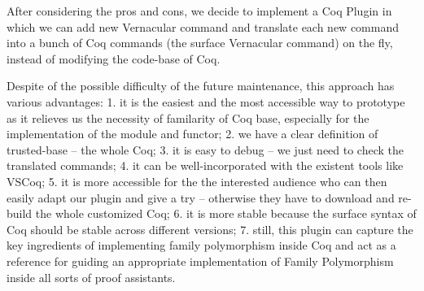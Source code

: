 After considering the pros and cons, we decide to implement a Coq Plugin in which we can add new Vernacular command and translate each new command into a bunch of Coq commands (the surface Vernacular command) on the fly, instead of modifying the code-base of Coq. 

Despite of the possible difficulty of the future maintenance, this approach has various advantages: 1. it is the easiest and the most accessible way to prototype as it relieves us the necessity of familarity of Coq base, especially for the implementation of the module and functor; 2. we have a clear definition of trusted-base -- the whole Coq; 3. it is easy to debug -- we just need to check the translated commands; 4. it can be well-incorporated with the existent tools like VSCoq; 5. it is more accessible for the the interested audience who can then easily adapt our plugin and give a try -- otherwise they have to download and re-build the whole customized Coq; 6. it is more stable because the surface syntax of Coq should be stable across different versions; 7. still, this plugin can capture the key ingredients of implementing family polymorphism inside Coq and act as a reference for guiding an appropriate implementation of Family Polymorphism inside all sorts of proof assistants.

